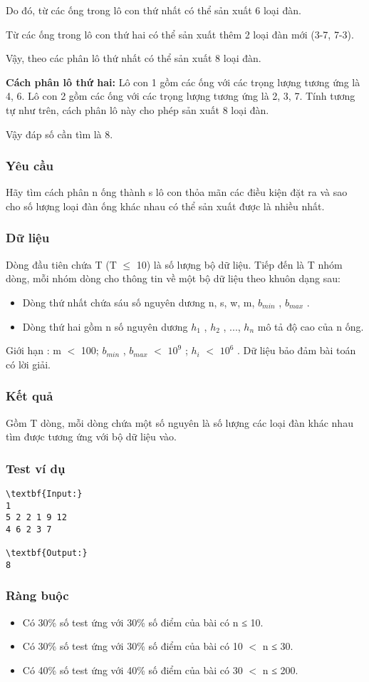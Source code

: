 Do đó, từ các ống trong lô con thứ nhất có thể sản xuất 6 loại đàn.


Từ các ống trong lô con thứ hai có thể sản xuất thêm 2 loại đàn mới (3-7, 7-3).


Vậy, theo các phân lô thứ nhất có thể sản xuất 8 loại đàn.

\textbf{Cách phân lô thứ hai: } Lô con 1 gồm các ống với các trọng lượng tương ứng là 4, 6. Lô con 2 gồm các ống với các trọng lượng tương ứng là 2, 3, 7. Tính tương tự như trên, cách phân lô này cho phép sản xuất 8 loại đàn.

Vậy đáp số cần tìm là 8.

\subsubsection{Yêu cầu}

Hãy tìm cách phân n ống thành s lô con thỏa mãn các điều kiện đặt ra và sao cho số lượng loại đàn ống khác nhau có thể sản xuất được là nhiều nhất.

\subsubsection{Dữ liệu}

Dòng đầu tiên chứa T (T $\le$ 10) là số lượng bộ dữ liệu. Tiếp đến là T nhóm dòng, mỗi nhóm dòng cho thông tin về một bộ dữ liệu theo khuôn dạng sau:
\begin{itemize}
	\item Dòng thứ nhất chứa sáu số nguyên dương n, s, w, m, $b_{min}$ , $b_{max}$ .
	\item Dòng thứ hai gồm n số nguyên dương $h_{1}$ , $h_{2}$ , ..., $h_{n}$ mô tả độ cao của n ống.
\end{itemize}

Giới hạn : m $<$ 100; $b_{min}$ , $b_{max}$ $<$ $10^{9}$ ; $h_{i}$ $<$ $10^{6}$ . Dữ liệu bảo đảm bài toán có lời giải.
\begin{itemize}
\end{itemize}

\subsubsection{Kết quả}

Gồm T dòng, mỗi dòng chứa một số nguyên là số lượng các loại đàn khác nhau tìm được tương ứng với bộ dữ liệu vào.

\subsubsection{Test ví dụ}
\begin{verbatim}
\textbf{Input:}
1
5 2 2 1 9 12
4 6 2 3 7

\textbf{Output:}
8\end{verbatim}

\subsubsection{Ràng buộc}
\begin{itemize}
	\item Có 30\% số test ứng với 30\% số điểm của bài có n ≤ 10.
	\item Có 30\% số test ứng với 30\% số điểm của bài có 10 $<$ n ≤ 30.
	\item Có 40\% số test ứng với 40\% số điểm của bài có 30 $<$ n ≤ 200.
\end{itemize}
